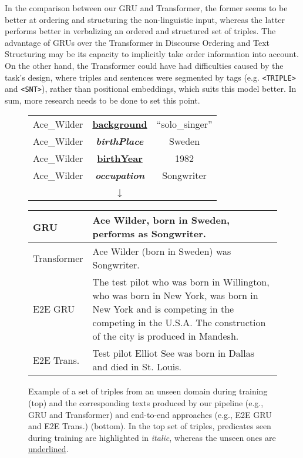 \documentclass[11pt,a4paper]{article}
\begin{document}
In the comparison between our GRU and Transformer, the former seems to be better at ordering and structuring the non-linguistic input, whereas the latter performs better in verbalizing an ordered and structured set of triples. The advantage of GRUs over the Transformer in Discourse Ordering and Text Structuring may be its capacity to implicitly take order information into account. On the other hand, the Transformer could have had difficulties caused by the task's design, where triples and sentences were segmented by tags (e.g. \texttt{<TRIPLE>} and \texttt{<SNT>}), rather than positional embeddings, which suits this model better. In sum, more research needs to be done to set this point.



\begin{figure*}
\footnotesize{
\begin{center}

\begin{tabular}{c c c}
Ace\_Wilder & \underline{\textbf{background}} & ``solo\_singer'' \\
Ace\_Wilder & \textit{\textbf{birthPlace}} & Sweden \\
Ace\_Wilder & \underline{\textbf{birthYear}} & 1982  \\
Ace\_Wilder & \textit{\textbf{occupation}} & Songwriter  \\
&  &   \\
 & $\downarrow$ &   \\
\end{tabular}

{\def\arraystretch{2}\tabcolsep=10pt
\begin{tabular}{l L}
GRU         & Ace Wilder, born in Sweden, performs as Songwriter. \\ \hline
Transformer & Ace Wilder (born in Sweden) was Songwriter. \\
\hline 
E2E GRU     & The test pilot who was born in Willington, who was born in New York, was born in New York and is competing in the competing in the U.S.A. The construction of the city is produced in Mandesh. \\
\hline
E2E Trans. &  Test pilot Elliot See was born in Dallas and died in St. Louis.
\end{tabular}}
\end{center}
\caption{Example of a set of triples from an unseen domain during training (top) and the corresponding texts produced by our pipeline (e.g., GRU and Transformer) and end-to-end approaches (e.g., E2E GRU and E2E Trans.) (bottom). In the top set of triples, predicates seen during training are highlighted in \textit{italic}, whereas the unseen ones are \underline{underlined}.}
\label{fig:example}
}
\end{figure*}
\end{document}
